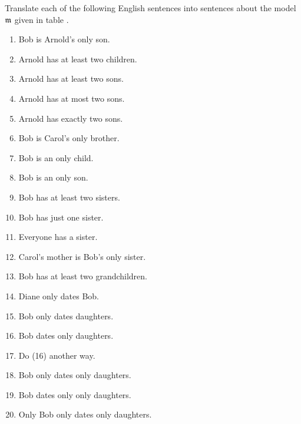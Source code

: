  Translate each of the following English sentences into \GQLI{} sentences about the model $\mathfrak{m}$ given in table .
\begin{multicols}{2}
\begin{enumerate}
\item Bob is Arnold's only son.
\item Arnold has at least two children.
\item Arnold has at least two sons.
\item Arnold has at most two sons.
\item Arnold has exactly two sons.
\item Bob is Carol's only brother.
\item Bob is an only child.
\item Bob is an only son.
\item Bob has at least two sisters.
\item Bob has just one sister.
\item Everyone has a sister.
\item Carol's mother is Bob's only sister.
\item Bob has at least two grandchildren.
\item Diane only dates Bob.
\item Bob only dates daughters.
\item Bob dates only daughters.
\item Do (16) another way.
\item Bob only dates only daughters.
\item Bob dates only only daughters.
\item Only Bob only dates only daughters.
\end{enumerate}
\end{multicols}
